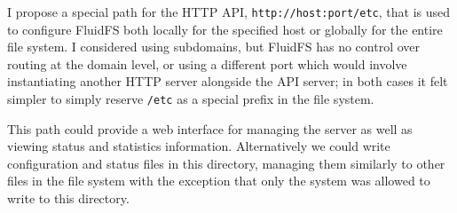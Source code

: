 \documentclass[letterpaper,twocolumn,10pt]{article}
\begin{document}
I propose a special path for the HTTP API, \texttt{http://host:port/etc}, that
is used to configure FluidFS both locally for the specified host or globally
for the entire file system.
I considered using subdomains, but FluidFS has no control over routing at the
domain level, or using a different port which would involve instantiating
another HTTP server alongside the API server; in both cases it felt simpler
to simply reserve \texttt{/etc} as a special prefix in the file system.

This path could provide a web interface for managing the server as well as
viewing status and statistics information.
Alternatively we could write configuration and status files in this
directory, managing them similarly to other files in the file system with the
exception that only the system was allowed to write to this directory.

{\footnotesize 
}
\end{document}

